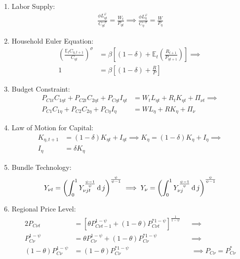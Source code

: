 \documentclass[
	thesis.tex
	]{subfiles}
\begin{document}
\begin{enumerate}
	\item Labor Supply:
	\begin{align}
		\frac{\phi L_{\eta t}^{\varphi}}{C_{\eta t}^{-\sigma}} = \frac{W_t}{P_{\eta t}} \implies \frac{\phi L_{\eta}^{\varphi}}{C_{\eta}^{-\sigma}} = \frac{W}{P_\eta} \label{eq:reg-ss-household-labor-supply}
	\end{align}
	
	\item Household Euler Equation: 
	\begin{align}
		\left( \frac{\mathbb{E}_t C_{\eta, t+1}}{C_{\eta t}} \right)^\sigma &= \beta \left[ (1-\delta) + \mathbb{E}_t \left(\frac{R_{t+1}}{P_{\eta t+1}}\right) \right] \implies \nonumber \\
		1 &= \beta \left[ (1-\delta) + \frac{R}{P} \right] \label{eq:reg-ss-household-euler-equation}
	\end{align}
	
	\item Budget Constraint: 
	\begin{align}
		P_{C1t} C_{1\eta t} + P_{C2t} C_{2\eta t} + P_{C\eta t} I_{\eta t} &= W_t L_{\eta t} + R_t K_{\eta t} + \Pi_{\nu t} \implies \nonumber \\
		P_{C1} C_{1\eta} + P_{C2} C_{2\eta} + P_{C\eta} I_{\eta} &= W L_{\eta} + R K_{\eta} + \Pi_{\nu} \label{eq:reg-ss-household-budget-constraint}
	\end{align}
	
	\item Law of Motion for Capital:
	\begin{align}
		K_{\eta, t+1} &= (1-\delta)K_{\eta t} + I_{\eta t} \implies K_{\eta} = (1-\delta)K_{\eta} + I_{\eta} \implies \nonumber \\
		I_{\eta} &= \delta K_{\eta} \label{eq:reg-ss-law-of-motion-for-capital}
	\end{align}
	
	\item Bundle Technology:
	\begin{align}
		Y_{\nu t} = \left( \int_{0}^{1} Y_{\nu jt}^{\frac{\psi-1}{\psi}} \dif j \right)^{\frac{\psi}{\psi-1}} \implies %
		Y_{\nu} = \left( \int_{0}^{1} Y_{\nu j}^{\frac{\psi-1}{\psi}} \dif j \right)^{\frac{\psi}{\psi-1}} \label{eq:reg-ss-final-goods-firm-bundle-rule}
	\end{align}
	
	\item Regional Price Level:
	\begin{alignat}{2}
		\label{eq:reg-ss-general-price-level}
		P_{C\nu t} &= \left[ \theta P_{C\nu t-1}^{1-\psi} + (1-\theta) P_{C\nu t}^{\ast 1-\psi} \right]^\frac{1}{1-\psi} &&\implies \nonumber \\
		P_{C\nu}^{1-\psi} &= \theta P_{C\nu}^{1-\psi} + (1-\theta) P_{C\nu}^{\ast 1-\psi} &&\implies \nonumber \\ 
		(1-\theta) P_{C\nu}^{1-\psi} &= (1-\theta) P_{C\nu}^{\ast 1-\psi} &&\implies P_{C\nu} = P_{C\nu}^\ast
	\end{alignat}
	

\end{enumerate}
\end{document}
